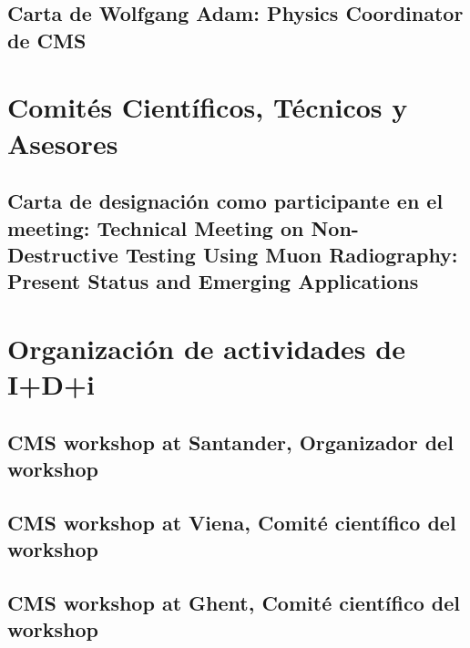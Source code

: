 \documentclass[a4paper, 11pt, twoside, openright]{report}
\begin{document}
\subsection{Carta de Wolfgang Adam: Physics Coordinator de CMS}




\section{Comités Científicos, Técnicos y Asesores}
\subsection{Carta de designación como participante en el meeting: Technical Meeting on Non-Destructive Testing Using Muon Radiography: Present Status and Emerging Applications}



\section{Organización de actividades de I+D+i}

\subsection{CMS workshop at Santander, Organizador del workshop}


\subsection{CMS workshop at Viena, Comité científico del workshop}


\subsection{CMS workshop at Ghent, Comité científico del workshop}

\end{document}
